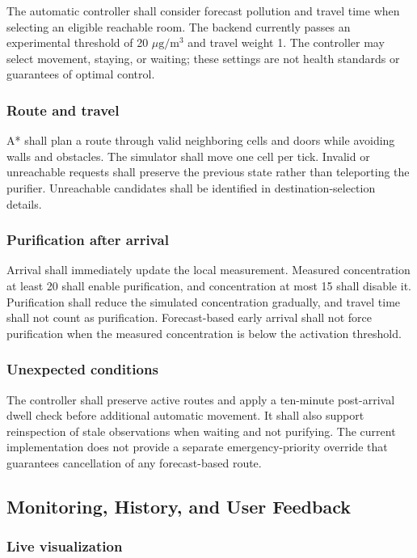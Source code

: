 \documentclass[conference]{IEEEtran}
\newcommand{\pmunit}{\ensuremath{\mu\mathrm{g}/\mathrm{m}^3}}
\begin{document}
The automatic controller shall consider forecast pollution and travel time when selecting an eligible reachable room. The backend currently passes an experimental threshold of 20 \pmunit{} and travel weight 1. The controller may select movement, staying, or waiting; these settings are not health standards or guarantees of optimal control.

\subsubsection{Route and travel}

A* shall plan a route through valid neighboring cells and doors while avoiding walls and obstacles. The simulator shall move one cell per tick. Invalid or unreachable requests shall preserve the previous state rather than teleporting the purifier. Unreachable candidates shall be identified in destination-selection details.

\subsubsection{Purification after arrival}

Arrival shall immediately update the local measurement. Measured concentration at least 20 shall enable purification, and concentration at most 15 shall disable it. Purification shall reduce the simulated concentration gradually, and travel time shall not count as purification. Forecast-based early arrival shall not force purification when the measured concentration is below the activation threshold.

\subsubsection{Unexpected conditions}

The controller shall preserve active routes and apply a ten-minute post-arrival dwell check before additional automatic movement. It shall also support reinspection of stale observations when waiting and not purifying. The current implementation does not provide a separate emergency-priority override that guarantees cancellation of any forecast-based route.

\subsection{Monitoring, History, and User Feedback}

\subsubsection{Live visualization}
\end{document}
